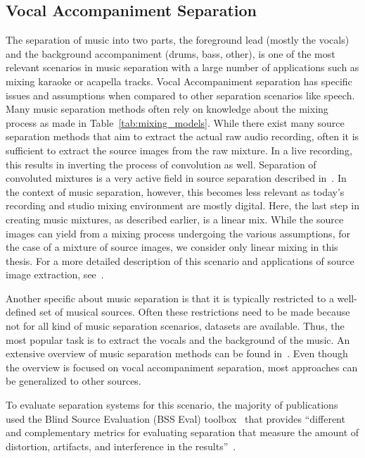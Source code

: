 \subsection{Vocal Accompaniment Separation}
The separation of music into two parts, the foreground lead (mostly the vocals) and the background accompaniment (drums, bass, other), is one of the most relevant scenarios in music separation with a large number of applications such as mixing karaoke or acapella tracks.
Vocal Accompaniment separation has specific issues and assumptions when compared to other separation scenarios like speech.
Many music separation methods often rely on knowledge about the mixing process as made in Table~\ref{tab:mixing_models}.
While there exist many source separation methods that aim to extract the actual raw audio recording, often it is sufficient to extract the source images from the raw mixture.
In a live recording, this results in inverting the process of convolution as well.
Separation of convoluted mixtures is a very active field in source separation described in~\cite{pedersen07}.
In the context of music separation, however, this becomes less relevant as today's recording and studio mixing environment are mostly digital.
Here, the last step in creating music mixtures, as described earlier, is a linear mix.
While the source images can yield from a mixing process undergoing the various assumptions, for the case of a mixture of source images, we consider only linear mixing in this thesis.
For a more detailed description of this scenario and applications of source image extraction, see~\cite{sturmel12}.
\par
Another specific about music separation is that it is typically restricted to a well-defined set of musical sources.
Often these restrictions need to be made because not for all kind of music separation scenarios, datasets are available.
Thus, the most popular task is to extract the vocals and the background of the music.
An extensive overview of music separation methods can be found in~\cite{rafii18}.
Even though the overview is focused on vocal accompaniment separation, most approaches can be generalized to other sources.
\par
To evaluate separation systems for this scenario, the majority of publications used the Blind Source Evaluation (BSS Eval) toolbox~\cite{fevotte05,vincent06} that provides ``different and complementary metrics for evaluating separation that measure the amount of distortion, artifacts, and interference in the results''~\cite{rafii18}.

